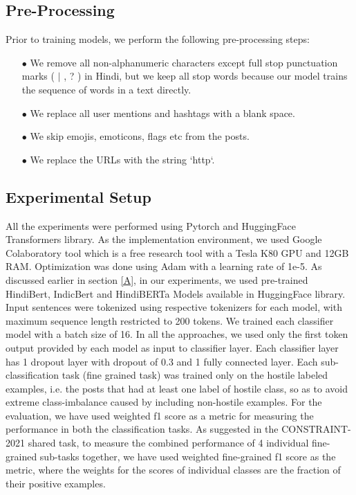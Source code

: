 \documentclass[runningheads]{llncs}
\begin{document}
\subsection{Pre-Processing}
Prior to training models, we perform the following pre-processing steps:
\begin{itemize}
    \item[$\bullet$] We remove all non-alphanumeric characters except full stop punctuation marks ( {$\vert$} , ? ) in Hindi, but we keep all stop words because our model trains the sequence of words in a text directly.
    \item[$\bullet$] We replace all user mentions and hashtags with a blank space.
    \item[$\bullet$] We skip emojis, emoticons, flags etc from the posts.
    \item[$\bullet$] We replace the URLs with the string `http`. 
    
\end{itemize}

\subsection{Experimental Setup}
\label{Ex}
All the experiments were performed using Pytorch \cite{ref_Pytorch} and HuggingFace \cite{ref_huggingface} Transformers library. As the implementation environment, we used Google Colaboratory tool which is a free research tool with a Tesla K80 GPU and 12GB RAM. Optimization was done using Adam \cite{adam} with a learning rate of 1e-5. As discussed earlier in section \ref{A}, in our experiments, we used pre-trained HindiBert\cite{HindiBERT}, IndicBert\cite{ref_indic_Nlp} and HindiBERTa \cite{HindiBERTa} Models available in HuggingFace library. Input sentences were tokenized using respective tokenizers for each model, with maximum sequence length restricted to 200 tokens. We trained each classifier model with a batch size of 16. In all the approaches, we used only the first token output provided by each model as input to classifier layer. Each classifier layer has 1 dropout layer with dropout of 0.3 and 1 fully connected layer. Each sub-classification task (fine grained task) was trained only on the hostile labeled examples, i.e. the posts that had at least one label of hostile class, so as to avoid extreme class-imbalance caused by including non-hostile examples. For the evaluation, we have used weighted f1 score \cite{scikit-learn} as a metric for measuring the performance in both the classification tasks. As suggested in the CONSTRAINT-2021 shared task\cite{patwa2021overview}, to measure the combined performance of 4 individual fine-grained sub-tasks together, we have used weighted fine-grained f1 score as the metric, where the weights for the scores of individual classes are the fraction of their positive examples.
\end{document}
